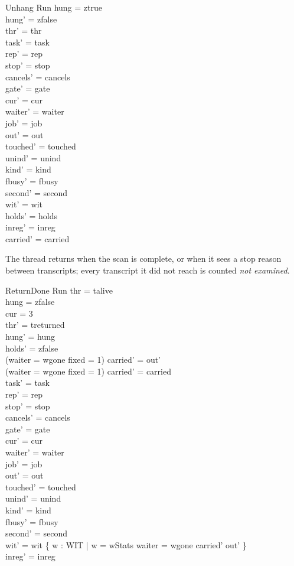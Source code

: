 \documentclass[a4paper,10pt,fleqn]{article}
\begin{document}
\begin{schema}{Unhang}
\Delta Run
\where
hung = ztrue \\
hung' = zfalse \\
thr' = thr \\
task' = task \\
rep' = rep \\
stop' = stop \\
cancels' = cancels \\
gate' = gate \\
cur' = cur \\
waiter' = waiter \\
job' = job \\
out' = out \\
touched' = touched \\
unind' = unind \\
kind' = kind \\
fbusy' = fbusy \\
second' = second \\
wit' = wit \\
holds' = holds \\
inreg' = inreg \\
carried' = carried
\end{schema}

The thread returns when the scan is complete, or when it sees a stop reason
between transcripts; every transcript it did not reach is counted \emph{not
examined}.

\begin{schema}{ReturnDone}
\Delta Run
\where
thr = talive \\
hung = zfalse \\
cur = 3 \\
thr' = treturned \\
hung' = hung \\
holds' = zfalse \\
(waiter = wgone \land fixed = 1) \implies carried' = out' \\
\lnot (waiter = wgone \land fixed = 1) \implies carried' = carried \\
task' = task \\
rep' = rep \\
stop' = stop \\
cancels' = cancels \\
gate' = gate \\
cur' = cur \\
waiter' = waiter \\
job' = job \\
out' = out \\
touched' = touched \\
unind' = unind \\
kind' = kind \\
fbusy' = fbusy \\
second' = second \\
wit' = wit \cup \{ w : WIT | w = wStats \land waiter = wgone \land carried' \neq out' \} \\
inreg' = inreg
\end{schema}
\end{document}
